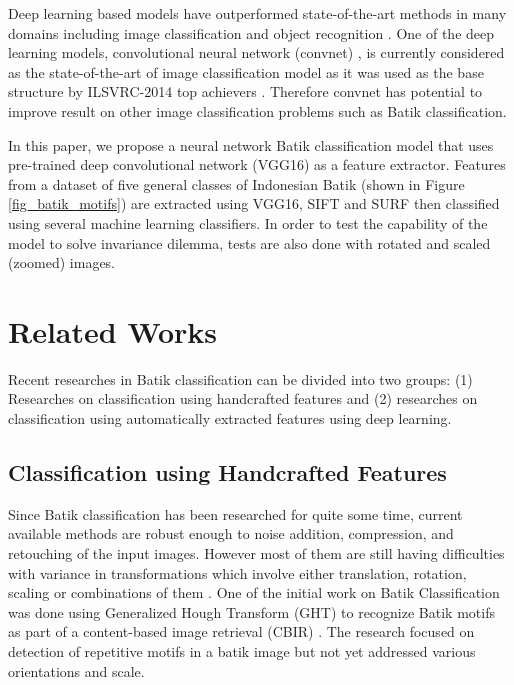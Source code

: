 \documentclass[conference, compsoc]{IEEEtran}
\begin{document}
Deep learning based models have outperformed state-of-the-art methods in many domains including image classification and object recognition \cite{lecun2015deep}. One of the deep learning models, convolutional neural network (convnet) \cite{lecun1998gradient}, is currently considered as the state-of-the-art of image classification model as it was used as the base structure by ILSVRC-2014 top achievers \cite{simonyan2014very}. Therefore convnet has potential to improve result on other image classification problems such as Batik classification.

In this paper, we propose a neural network Batik classification model that uses pre-trained deep convolutional network (VGG16) \cite{simonyan2014very} as a feature extractor. Features from a dataset of five general classes of Indonesian Batik (shown in Figure \ref{fig_batik_motifs}) are extracted using VGG16, SIFT and SURF then classified using several machine learning classifiers. In order to test the capability of the model to solve invariance dilemma, tests are also done with rotated and scaled (zoomed) images.

\section{Related Works}

Recent researches in Batik classification can be divided into two groups: (1) Researches on classification using handcrafted features and (2) researches on classification using automatically extracted features using deep learning.

\subsection{Classification using Handcrafted Features}

Since Batik classification has been researched for quite some time, current available methods are robust enough to noise addition, compression, and retouching of the input images. However most of them are still having difficulties with variance in transformations which involve either translation, rotation, scaling or combinations of them \cite{nurhaida2015automatic}. One of the initial work on Batik Classification was done using Generalized Hough Transform (GHT) to recognize Batik motifs as part of a content-based image retrieval (CBIR) \cite{sanabila2009recognition}. The research focused on detection of repetitive motifs in a batik image but not yet addressed various orientations and scale. 
\end{document}
